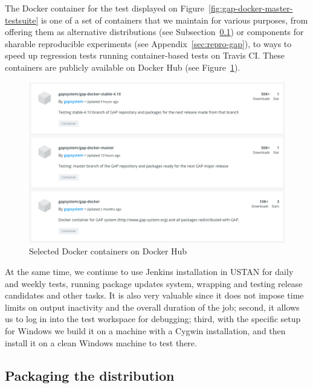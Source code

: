 The Docker container for the test displayed on Figure~\ref{fig:gap-docker-master-testsuite}
is one of a set of containers that we maintain for various purposes, from offering 
them as alternative distributions (see Subsection~\ref{distro}) or components for sharable
reproducible experiments (see Appendix~\ref{sec:repro-gap}), to ways to speed up regression tests running
container-based tests on Travis CI. These containers are publicly available on Docker Hub
(see Figure~\ref{fig:gap-docker}).

\begin{figure}[!ht]
    \centering
    \includegraphics[width=12cm]{images/gap-docker}
    \caption{Selected \GAP Docker containers on Docker Hub}
    \label{fig:gap-docker}
\end{figure}

At the same time, we continue to use Jenkins installation in USTAN 
for daily and weekly tests, running package updates system, wrapping and
testing release candidates and other tasks. It is also very valuable since 
it does not impose time limits on output inactivity and the overall duration
of the job; second, it allows us to log in into the test workspace for
debugging; third, with the specific \GAP setup for Windows we build it on a
machine with a Cygwin installation, and then install it on a clean Windows
machine to test there. 


\subsection{Packaging the \GAP distribution}\label{distro}


